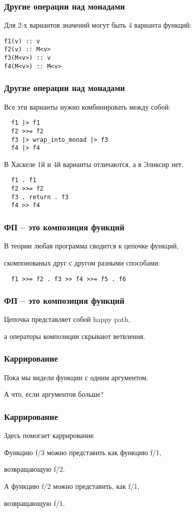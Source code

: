 \documentclass[10pt]{beamer}
\begin{document}
\begin{frame}[fragile]
  \frametitle{Другие операции над монадами}
  Для 2-х вариантов значений могут быть 4 варианта функций:
  \par \bigskip
  \begin{lstlisting}
f1(v) :: v
f2(v) :: M<v>
f3(M<v>) :: v
f4(M<v>) :: M<v>
  \end{lstlisting}
\end{frame}

\begin{frame}[fragile]
  \frametitle{Другие операции над монадами}
  Все эти варианты нужно комбинировать между собой:
  \par \bigskip
  \begin{lstlisting}
  f1 |> f1
  f2 >>= f2
  f3 |> wrap_into_monad |> f3
  f4 |> f4
  \end{lstlisting}
  \par \bigskip
  В Хаскеле 1й и 4й варианты отличаются, а в Эликсир нет.
  \par \bigskip
  \begin{lstlisting}
  f1 . f1
  f2 >>= f2
  f3 . return . f3
  f4 >> f4
  \end{lstlisting}
\end{frame}

\begin{frame}[fragile]
  \frametitle{ФП -- это композиция функций}
В теории любая программа сводится к цепочке функций,
  \par \bigskip
скомпонованых друг с другом разными способами:
  \par \bigskip
  \begin{lstlisting}
  f1 >>= f2 . f3 >> f4 >>= f5 . f6
  \end{lstlisting}
\end{frame}

\begin{frame}
  \frametitle{ФП -- это композиция функций}
Цепочка представляет собой happy path,
  \par \bigskip
а операторы композиции скрывают ветвления.
\end{frame}

\begin{frame}
  \frametitle{Каррирование}
  Пока мы видели функции с одним аргументом.
  \par \bigskip
  А что, если аргументов больше?
\end{frame}

\begin{frame}
  \frametitle{Каррирование}
  Здесь помогает каррирование.
  \par \bigskip
  Функцию f/3 можно представить как функцию f/1,
  \par
  возвращающую f/2.
  \par \bigskip
  А функцию f/2 можно представить, как f/1,
  \par
  возвращающую f/1.
\end{frame}
\end{document}
